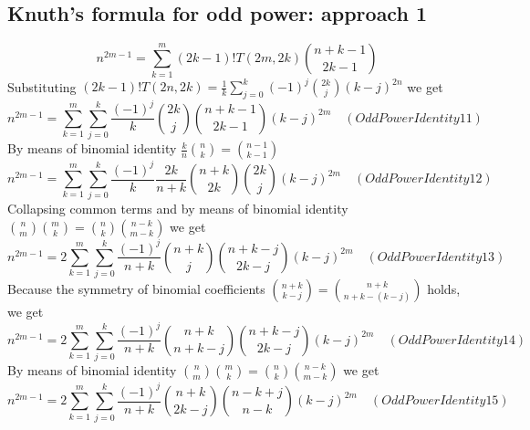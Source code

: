 \subsection{Knuth's formula for odd power: approach 1}\label{subsec:knuth's-formula-for-odd-power-approach-1}
\begin{equation*}
    n^{2m-1} = \sum_{k=1}^{m} (2k-1)! T(2m,2k) \binom{n+k-1}{2k-1}
\end{equation*}
Substituting $(2k-1)!T(2n,2k) = \frac{1}{k} \sum_{j=0}^{k} (-1)^j \binom{2k}{j} (k-j)^{2n}$ we get
\begin{equation*}
    n^{2m-1} = \sum_{k=1}^{m} \sum_{j=0}^{k} \frac{(-1)^j}{k} \binom{2k}{j} \binom{n+k-1}{2k-1} (k-j)^{2m} \quad
    (OddPowerIdentity11)
\end{equation*}
By means of binomial identity $\frac{k}{n} \binom{n}{k} = \binom{n-1}{k-1}$
\begin{equation*}
    n^{2m-1} = \sum_{k=1}^{m} \sum_{j=0}^{k} \frac{(-1)^{j}}{k} \frac{2k}{n+k} \binom{n+k}{2k} \binom{2k}{j} (k-j)^{2m} \quad
    (OddPowerIdentity12)
\end{equation*}
Collapsing common terms and by means of binomial identity $\binom{n}{m} \binom{m}{k} = \binom{n}{k} \binom{n-k}{m-k}$ we get
\begin{equation*}
    n^{2m-1} = 2\sum_{k=1}^{m} \sum_{j=0}^{k} \frac{(-1)^{j}}{n+k} \binom{n+k}{j} \binom{n+k-j}{2k-j} (k-j)^{2m} \quad
    (OddPowerIdentity13)
\end{equation*}
Because the symmetry of binomial coefficients $\binom{n+k}{k-j} = \binom{n+k}{n+k-(k-j)}$ holds, we get
\begin{equation*}
    n^{2m-1} = 2\sum_{k=1}^{m} \sum_{j=0}^{k} \frac{(-1)^{j}}{n+k} \binom{n+k}{n+k-j} \binom{n+k-j}{2k-j} (k-j)^{2m} \quad
    (OddPowerIdentity14)
\end{equation*}
By means of binomial identity $\binom{n}{m} \binom{m}{k} = \binom{n}{k} \binom{n-k}{m-k}$ we get
\begin{equation*}
    n^{2m-1} = 2\sum_{k=1}^{m} \sum_{j=0}^{k} \frac{(-1)^{j}}{n+k} \binom{n+k}{2k-j} \binom{n-k+j}{n-k} (k-j)^{2m} \quad
    (OddPowerIdentity15)
\end{equation*}